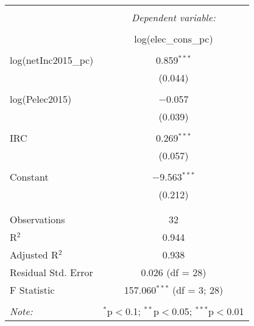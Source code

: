 
\begin{table}[!htbp] \centering 
  \caption{} 
  \label{} 
\begin{tabular}{@{\extracolsep{5pt}}lc} 
\\[-1.8ex]\hline 
\hline \\[-1.8ex] 
 & \multicolumn{1}{c}{\textit{Dependent variable:}} \\ 
\cline{2-2} 
\\[-1.8ex] & log(elec\_cons\_pc) \\ 
\hline \\[-1.8ex] 
 log(netInc2015\_pc) & 0.859$^{***}$ \\ 
  & (0.044) \\ 
  & \\ 
 log(Pelec2015) & $-$0.057 \\ 
  & (0.039) \\ 
  & \\ 
 IRC & 0.269$^{***}$ \\ 
  & (0.057) \\ 
  & \\ 
 Constant & $-$9.563$^{***}$ \\ 
  & (0.212) \\ 
  & \\ 
\hline \\[-1.8ex] 
Observations & 32 \\ 
R$^{2}$ & 0.944 \\ 
Adjusted R$^{2}$ & 0.938 \\ 
Residual Std. Error & 0.026 (df = 28) \\ 
F Statistic & 157.060$^{***}$ (df = 3; 28) \\ 
\hline 
\hline \\[-1.8ex] 
\textit{Note:}  & \multicolumn{1}{r}{$^{*}$p$<$0.1; $^{**}$p$<$0.05; $^{***}$p$<$0.01} \\ 
\end{tabular} 
\end{table} 
